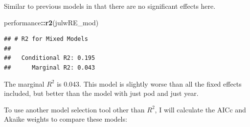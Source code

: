 \documentclass[
]{article}
\newenvironment{Shaded}{\begin{snugshade}}{\end{snugshade}}
\newcommand{\FunctionTok}[1]{\textcolor[rgb]{0.13,0.29,0.53}{\textbf{#1}}}
\newcommand{\NormalTok}[1]{#1}
\newcommand{\SpecialCharTok}[1]{\textcolor[rgb]{0.81,0.36,0.00}{\textbf{#1}}}
\begin{document}
Similar to previous models in that there are no significant effects
here.

\begin{Shaded}
\begin{Highlighting}[]
\NormalTok{performance}\SpecialCharTok{::}\FunctionTok{r2}\NormalTok{(julwRE\_mod)}
\end{Highlighting}
\end{Shaded}

\begin{verbatim}
## # R2 for Mixed Models
## 
##   Conditional R2: 0.195
##      Marginal R2: 0.043
\end{verbatim}

The marginal \(R^2\) is 0.043. This model is slightly worse than all the
fixed effects included, but better than the model with just pod and just
year.

To use another model selection tool other than \(R^2\), I will calculate
the AICc and Akaike weights to compare these models:
\end{document}
